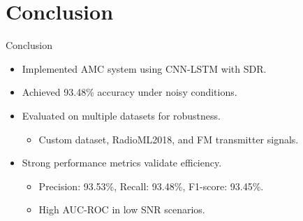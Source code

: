 \section{Conclusion}

\begin{frame}{Conclusion}
    \begin{itemize}
        \item Implemented AMC system using CNN-LSTM with SDR. \vfill
        \item Achieved 93.48\% accuracy under noisy conditions. \vfill
        \item Evaluated on multiple datasets for robustness. \vfill
        \begin{itemize}
            \item Custom dataset, RadioML2018, and FM transmitter signals. \vfill
        \end{itemize}
        \item Strong performance metrics validate efficiency. \vfill
        \begin{itemize}
            \item Precision: 93.53\%, Recall: 93.48\%, F1-score: 93.45\%. \vfill
            \item High AUC-ROC in low SNR scenarios. \vfill

        \end{itemize}
    \end{itemize}
\end{frame}